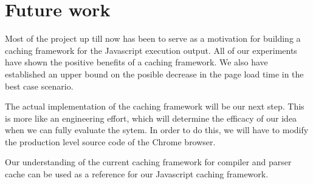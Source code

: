 \section{Future work}
\label{sec:future-work}

Most of the project up till now has been to serve as a motivation for building 
a caching framework for the Javascript execution output. All of our experiments
have shown the positive benefits of a caching framework. 
We also have established an upper bound on the posible decrease in the page load time
in the best case scenario. 

The actual implementation of the caching framework will be our next step. 
This is more like an engineering effort, which will determine the efficacy
of our idea when we can fully evaluate the sytem. 
In order to do this, we will have to modify the production level 
source code of the Chrome browser. 

Our understanding of the current caching framework for compiler
and parser cache can be used as a reference for our Javascript caching
framework. 


